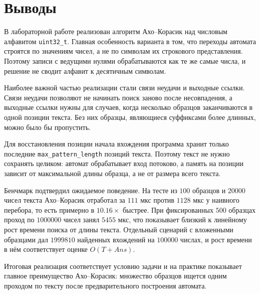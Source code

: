 \section{Выводы}

В лабораторной работе реализован алгоритм Ахо--Корасик над числовым алфавитом
\texttt{uint32\_t}. Главная особенность варианта в том, что переходы автомата строятся по значениям
чисел, а не по символам их строкового представления. Поэтому записи с ведущими нулями обрабатываются
как те же самые числа, и решение не сводит алфавит к десятичным символам.

Наиболее важной частью реализации стали связи неудачи и выходные ссылки. Связи неудачи позволяют не
начинать поиск заново после несовпадения, а выходные ссылки нужны для случаев, когда несколько образцов
заканчиваются в одной позиции текста. Без них образцы, являющиеся суффиксами более длинных, можно было
бы пропустить.

Для восстановления позиции начала вхождения программа хранит только последние
\texttt{max\_pattern\_length} позиций текста. Поэтому текст не нужно сохранять целиком: автомат
обрабатывает вход потоково, а память на позиции зависит от максимальной длины образца, а не от размера
всего текста.

Бенчмарк подтвердил ожидаемое поведение. На тесте из \(100\) образцов и \(20000\) чисел текста
Ахо--Корасик отработал за \(111\) мкс против \(1128\) мкс у наивного перебора, то есть примерно в
\(10.16\times\) быстрее. При фиксированных \(500\) образцах проход по \(1000000\) чисел занял
\(5455\) мкс, что показывает близкий к линейному рост времени поиска от длины текста. Отдельный
сценарий с вложенными образцами дал \(1999810\) найденных вхождений на \(100000\) числах, и рост
времени в нём соответствует оценке \(O(T + Ans)\).

Итоговая реализация соответствует условию задачи и на практике показывает главное преимущество
Ахо--Корасик: множество образцов ищется одним проходом по тексту после предварительного построения
автомата.
\pagebreak
